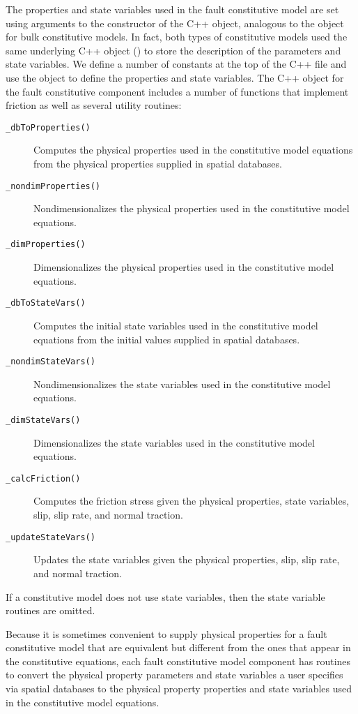 The properties and state variables used in the fault constitutive
model are set using arguments to the constructor of the C++ 
object, analogous to the  object for bulk
constitutive models. In fact, both types of constitutive models used
the same underlying C++ object ()
to store the description of the parameters and state variables. We
define a number of constants at the top of the C++ file and use the
 object to define the properties and state variables.
The C++ object for the fault constitutive component includes a number
of functions that implement friction as well as several utility routines:
\begin{description}
\item [{\texttt{\_dbToProperties()}}] Computes the physical properties
  used in the constitutive model equations from the physical properties
  supplied in spatial databases.
\item [{\texttt{\_nondimProperties()}}] Nondimensionalizes the physical
  properties used in the constitutive model equations.
\item [{\texttt{\_dimProperties()}}] Dimensionalizes the physical properties
  used in the constitutive model equations.
\item [{\texttt{\_dbToStateVars()}}] Computes the initial state variables
  used in the constitutive model equations from the initial values supplied
  in spatial databases.
\item [{\texttt{\_nondimStateVars()}}] Nondimensionalizes the state variables
  used in the constitutive model equations.
\item [{\texttt{\_dimStateVars()}}] Dimensionalizes the state variables
  used in the constitutive model equations.
\item [{\texttt{\_calcFriction()}}] Computes the friction stress given
  the physical properties, state variables, slip, slip rate, and normal
  traction.
\item [{\texttt{\_updateStateVars()}}] Updates the state variables given
  the physical properties, slip, slip rate, and normal traction.
\end{description}
If a constitutive model does not use state variables, then the state
variable routines are omitted. 

Because it is sometimes convenient to supply physical properties for a
fault constitutive model that are equivalent but different from the
ones that appear in the constitutive equations, each fault
constitutive model component has routines to convert the physical
property parameters and state variables a user specifies via spatial
databases to the physical property properties and state variables used
in the constitutive model equations.

